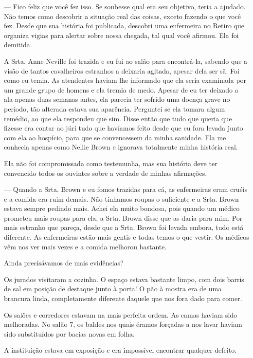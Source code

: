 --- Fico feliz que você fez isso. Se soubesse qual era seu objetivo,
teria a ajudado. Não temos como descobrir a situação real das coisas,
exceto fazendo o que você fez. Desde que sua história foi publicada,
descobri uma enfermeira no Retiro que organiza vigias para alertar sobre
nossa chegada, tal qual você afirmou. Ela foi demitida.

A Srta. Anne Neville foi trazida e eu fui ao salão para encontrá-la,
sabendo que a visão de tantos cavalheiros estranhos a deixaria agitada,
apesar dela ser sã. Foi como eu temia. As atendentes haviam lhe
informado que ela seria examinada por um grande grupo de homens e ela
tremia de medo. Apesar de eu ter deixado a ala apenas duas semanas
antes, ela parecia ter sofrido uma doença grave no período, tão alterada
estava sua aparência. Perguntei se ela tomara algum remédio, ao que ela
respondeu que sim. Disse então que tudo que queria que fizesse era
contar ao júri tudo que havíamos feito desde que eu fora levada junto
com ela ao hospício, para que se convencessem da minha sanidade. Ela me
conhecia apenas como Nellie Brown e ignorava totalmente minha história
real.

Ela não foi compromissada como testemunha, mas sua história deve ter
convencido todos os ouvintes sobre a verdade de minhas afirmações.

--- Quando a Srta. Brown e eu fomos trazidas para cá, as enfermeiras
eram cruéis e a comida era ruim demais. Não tínhamos roupas o suficiente
e a Srta. Brown estava sempre pedindo mais. Achei ela muito bondosa,
pois quando um médico prometeu mais roupas para ela, a Srta. Brown disse
que as daria para mim. Por mais estranho que pareça, desde que a Srta.
Brown foi levada embora, tudo está diferente. As enfermeiras estão mais
gentis e todas temos o que vestir. Os médicos vêm nos ver mais vezes e a
comida melhorou bastante.

Ainda precisávamos de mais evidências?

Os jurados visitaram a cozinha. O espaço estava bastante limpo, com dois
barris de sal em posição de destaque junto à porta! O pão à mostra era
de uma brancura linda, completamente diferente daquele que nos fora dado
para comer.

Os salões e corredores estavam na mais perfeita ordem. As camas haviam
sido melhoradas. No salão 7, os baldes nos quais éramos forçadas a nos
lavar haviam sido substituídos por bacias novas em folha.

A instituição estava em exposição e era impossível encontrar qualquer
defeito.

